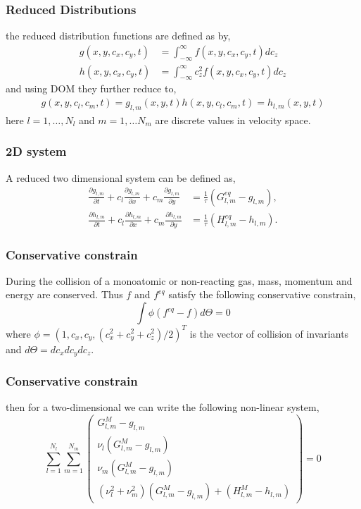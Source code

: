\begin{frame}
	\frametitle{Reduced Distributions}
	the reduced distribution functions are defined as by,
	\begin{align*}
			g(x,y,c_x,c_y,t) &= \int^{\infty}_{-\infty} f(x,y,c_x,c_y,t) dc_z \\
			h(x,y,c_x,c_y,t) &= \int^{\infty}_{-\infty} c^2_z f(x,y,c_x,c_y,t) dc_z
	\end{align*}
	and using DOM they further reduce to,
	\begin{align*}
			g(x,y,c_l,c_m,t) = g_{l,m}(x,y,t)
			h(x,y,c_l,c_m,t) = h_{l,m}(x,y,t)
	\end{align*}
	here $l = 1, \dots ,N_l$ and $m = 1, \dots N_m$ are discrete values in velocity space.
\end{frame}

\begin{frame}
	\frametitle{2D system}
	A reduced two dimensional system can be defined as,
	\begin{align*}
	 \frac{\partial g_{l,m}}{\partial t} + c_l \frac{\partial g_{l,m}}{\partial x} + c_m \frac{\partial g_{l,m}}{\partial y} &= \frac{1}{\tau}(G^{eq}_{l,m} - g_{l,m}), \\
	\frac{\partial h_{l,m}}{\partial t} + c_l \frac{\partial h_{l,m}}{\partial x} + c_m \frac{\partial h_{l,m}}{\partial y} &= \frac{1}{\tau}(H^{eq}_{l,m} - h_{l,m}).
	\end{align*}
\end{frame}

\begin{frame}
	\frametitle{Conservative constrain}
	During the collision of a monoatomic or non-reacting gas, mass, momentum and energy are conserved. Thus $f$ and $f^{eq}$ satisfy the following conservative constrain,
		\begin{equation}
			\int \phi (f^{eq}-f) d\Theta = 0
		\end{equation}
		where $\phi = (1, c_x, c_y, (c^2_x+c^2_y+c^2_z)/2)^T$ is the vector of collision of invariants and $d\Theta = dc_x dc_y dc_z$.
\end{frame}

\begin{frame}
	\frametitle{Conservative constrain}
	then for a two-dimensional we can write the following non-linear system,
	\begin{equation}
		\sum_{l=1}^{N_l}\sum_{m=1}^{N_m} 
			\begin{pmatrix}
			G_{l,m}^{M}-g_{l,m}\\ 
			\nu_l (G_{l,m}^{M}-g_{l,m})\\ 
			\nu_m (G_{l,m}^{M}-g_{l,m})\\ 
			(\nu_l^2+\nu_m^2) (G_{l,m}^{M}-g_{l,m})+(H_{l,m}^{M}-h_{l,m})
			\end{pmatrix} = 0 
	\end{equation}
\end{frame}

